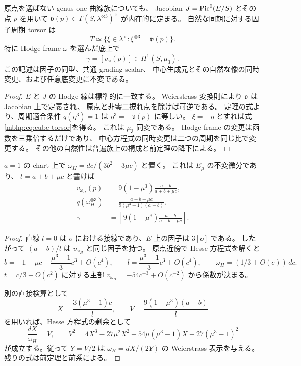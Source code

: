 \begin{corollary}
\label{mbhp:cor:global-kummer}
原点を選ばない genus-one 曲線族についても、
Jacobian $J=\operatorname{Pic}^0(E/S)$ とその点 $p$ を用いて
$\mathfrak v(p)\in\Gamma(S,\lambda^{\otimes3})^\times$ が内在的に定まる。
自然な同期に対する因子周期 torsor は
\begin{equation}\label{mbhp:eq:cube-torsor}
 T\simeq\{\xi\in\lambda^\times:
              \xi^{\otimes3}=\mathfrak v(p)\}.
\end{equation}
特に Hodge frame $\omega$ を選んだ底上で
\[
 \gamma=[v_\omega(p)]\in H^1(S,\mu_3).
\]
この記述は因子の同型、共通 grading scalar、
中心生成元とその自然な像の同時変更、および任意底変更に不変である。
\end{corollary}
\begin{proof}
$E$ と $J$ の Hodge 線は標準的に一致する。
Weierstrass 変換則により $\mathfrak v$ は Jacobian 上で定義され、
原点と非零二捩れ点を除けば可逆である。
定理の式より、周期適合条件 $q(\eta^3)=1$ は
$\eta^3=-\mathfrak v(p)$ に等しい。
$\xi=-\eta$ とすれば式\eqref{mbhp:eq:cube-torsor}を得る。
これは $\mu_3$-同変である。
Hodge frame の変更は函数を三乗倍するだけであり、
中心方程式の同時変更は二つの周期を同じ比で変更する。
その他の自然性は普遍族上の構成と前定理の降下による。
\end{proof}

\begin{corollary}
\label{mbhp:cor:hesse-expression}
$a=1$ の chart 上で
$\omega_H=dc/(3b^2-3\mu c)$ と置く。
これは $E_\mu$ の不変微分であり、
$l=a+b+\mu c$ と書けば
\begin{equation}\label{mbhp:eq:hesse-phase}
 \begin{split}
 v_{\omega_H}(p)&=
       9(1-\mu^3)\frac{a-b}{a+b+\mu c},\\
 q(\omega_H^{\otimes3})&=
       \frac{a+b+\mu c}{9(\mu^3-1)(a-b)},\\
 \gamma&=\left[
       9(1-\mu^3)\frac{a-b}{a+b+\mu c}\right].
 \end{split}
\end{equation}
\end{corollary}
\begin{proof}
直線 $l=0$ は $o$ における接線であり、$E$ 上の因子は $3[o]$ である。
したがって $(a-b)/l$ は $v_{\omega_H}$ と同じ因子を持つ。
原点近傍で Hesse 方程式を解くと
\[
 b=-1-\mu c+\frac{\mu^3-1}{3}c^3+O(c^4),\qquad
 l=\frac{\mu^3-1}{3}c^3+O(c^4),\qquad
 \omega_H=(1/3+O(c))\,dc.
\]
$t=c/3+O(c^2)$ に対する主部
$v_{\omega_H}=-54c^{-3}+O(c^{-2})$ から係数が決まる。

別の直接検算として
\[
 X=\frac{3(\mu^3-1)c}{l},\qquad
 V=\frac{9(1-\mu^3)(a-b)}{l}
\]
を用いれば、Hesse 方程式の剰余として
\[
 \frac{dX}{\omega_H}=V,\qquad
 V^2=4X^3-27\mu^2X^2+
       54\mu(\mu^3-1)X-27(\mu^3-1)^2
\]
が成立する。従って $Y=V/2$ は
$\omega_H=dX/(2Y)$ の Weierstrass 表示を与える。
残りの式は前定理と前系による。
\end{proof}

